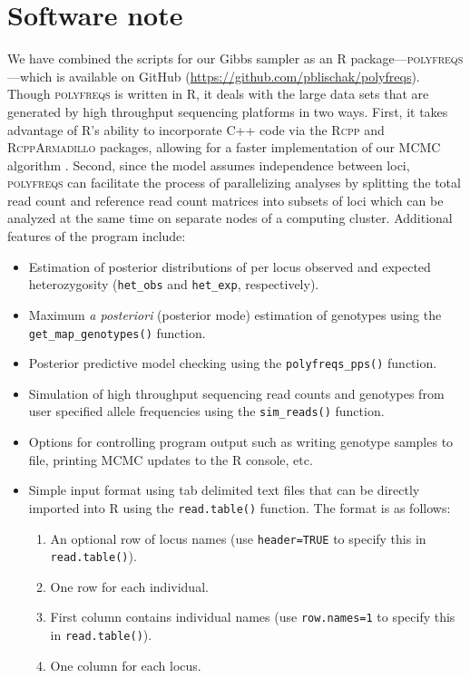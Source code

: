 \documentclass[11pt,english,letterpaper,oneside]{article}
\begin{document}
\section{Software note}  %

We have combined the scripts for our Gibbs sampler as an R package---\textsc{polyfreqs}---which is available on GitHub (\url{https://github.com/pblischak/polyfreqs}). Though \textsc{polyfreqs} is written in R, it deals with the large data sets that are generated by high throughput sequencing platforms in two ways. First, it takes advantage of R's ability to incorporate C++ code via the \textsc{Rcpp} and \textsc{RcppArmadillo} packages, allowing for a faster implementation of our MCMC algorithm \citep{eddelbuettel2011rcpp,eddelbuettel2013rcppBook,eddelbuettel2014rcpparmadillo}. Second, since the model assumes independence between loci, \textsc{polyfreqs} can facilitate the process of parallelizing analyses by splitting the total read count and reference read count matrices into subsets of loci which can be analyzed at the same time on separate nodes of a computing cluster. Additional features of the program include:
\medskip

\begin{itemize}
	\item Estimation of posterior distributions of per locus observed and expected heterozygosity (\texttt{het\_obs} and \texttt{het\_exp}, respectively).
	\item Maximum \textit{a posteriori} (posterior mode) estimation of genotypes using the \texttt{get\_map\_genotypes()} function.
	\item Posterior predictive model checking using the \texttt{polyfreqs\_pps()} function.
	\item Simulation of high throughput sequencing read counts and genotypes from user specified allele frequencies using the \texttt{sim\_reads()} function.
	\item Options for controlling program output such as writing genotype samples to file, printing MCMC updates to the R console, etc.
	\item Simple input format using tab delimited text files that can be directly imported into R using the \texttt{read.table()} function. The format is as follows:
	\begin{enumerate}
		\item An optional row of locus names (use \texttt{header=TRUE} to specify this in \texttt{read.table()}).
		\item One row for each individual.
		\item First column contains individual names (use \texttt{row.names=1} to specify this in \texttt{read.table()}).
		\item One column for each locus.
	\end{enumerate}
\end{itemize}
\medskip
\end{document}

